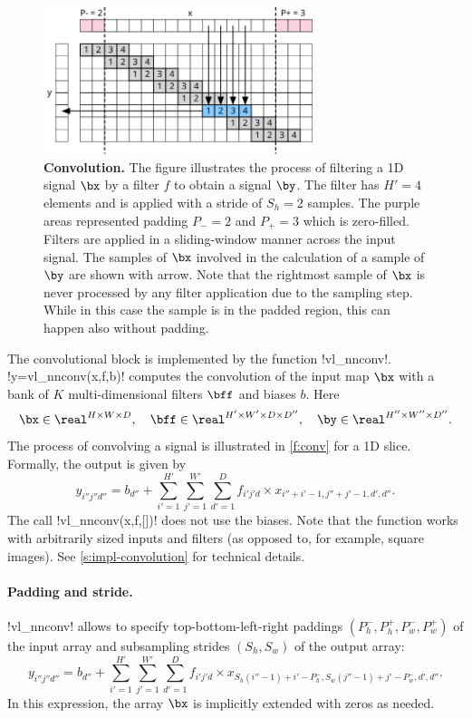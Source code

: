 \begin{figure}[t]
	\centering
	\includegraphics[width=0.7\textwidth]{figures/svg/conv}
	\caption{\textbf{Convolution.} The figure illustrates the process of filtering a 1D signal $\bx$ by a filter $f$ to obtain a signal $\by$. The filter has $H'=4$ elements and is applied with a stride of $S_h =2$ samples. The purple areas represented padding $P_-=2$ and $P_+=3$ which is zero-filled. Filters are applied in a sliding-window manner across the input signal. The samples of $\bx$ involved in the calculation of a sample of $\by$ are shown with arrow. Note that the rightmost sample of $\bx$  is never processed by any filter application due to the sampling step. While in this case the sample is in the padded region, this can happen also without padding.}\label{f:conv}
\end{figure}

The convolutional block is implemented by the function !vl_nnconv!. !y=vl_nnconv(x,f,b)! computes the convolution of the input map $\bx$ with a bank of $K$ multi-dimensional filters $\bff$ and biases $b$. Here
\[
 \bx\in\real^{H \times W \times D}, \quad
 \bff\in\real^{H' \times W' \times D \times D''}, \quad
 \by\in\real^{H'' \times W'' \times D''}.
\]
The process of convolving a signal is illustrated in \autoref{f:conv} for a 1D slice. Formally, the output is given by
\[
y_{i''j''d''}
=
b_{d''}
+
\sum_{i'=1}^{H'}
\sum_{j'=1}^{W'}
\sum_{d'=1}^D
f_{i'j'd} \times x_{i''+i'-1,j''+j'-1,d',d''}.
\]
The call !vl_nnconv(x,f,[])! does not use the biases. Note that the function works with arbitrarily sized inputs and filters (as opposed to, for example, square images). See \autoref{s:impl-convolution} for technical details.

\paragraph{Padding and stride.} !vl_nnconv! allows to specify  top-bottom-left-right paddings $(P_h^-,P_h^+,P_w^-,P_w^+)$ of the input array and subsampling strides $(S_h,S_w)$ of the output array:
\[
y_{i''j''d''}
=
b_{d''}
+
\sum_{i'=1}^{H'}
\sum_{j'=1}^{W'}
\sum_{d'=1}^D
f_{i'j'd} \times x_{S_h (i''-1)+i'-P_h^-, S_w(j''-1)+j' - P_w^-,d',d''}.
\]
In this expression, the array $\bx$ is implicitly extended with zeros as needed.

